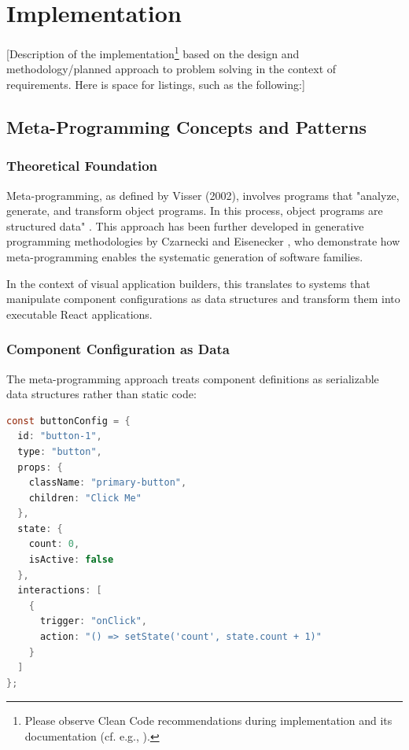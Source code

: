 \documentclass[oneside,12pt]{book}
\begin{document}
\chapter{Implementation}
[Description of the implementation\footnote{Please observe Clean Code recommendations during implementation and its documentation (cf. e.g., \cite{martin2008}).} based on the design and methodology/planned approach to problem solving in the context of requirements. Here is space for listings, such as the following:]

\section{Meta-Programming Concepts and Patterns}
\label{sec:meta-programming}

\subsection{Theoretical Foundation}

Meta-programming, as defined by Visser (2002), involves programs that "analyze, generate, and transform object programs. In this process, object programs are structured data" \cite{visser2002}. This approach has been further developed in generative programming methodologies by Czarnecki and Eisenecker \cite{czarnecki2000generative}, who demonstrate how meta-programming enables the systematic generation of software families. 

In the context of visual application builders, this translates to systems that manipulate component configurations as data structures and transform them into executable React applications.

\subsection{Component Configuration as Data}

The meta-programming approach treats component definitions as serializable data structures rather than static code:

\begin{lstlisting}[language=Java, caption={Component Configuration Data Structure}]
const buttonConfig = {
  id: "button-1",
  type: "button",
  props: {
    className: "primary-button",
    children: "Click Me"
  },
  state: {
    count: 0,
    isActive: false
  },
  interactions: [
    {
      trigger: "onClick",
      action: "() => setState('count', state.count + 1)"
    }
  ]
};
\end{lstlisting}
\end{document}
